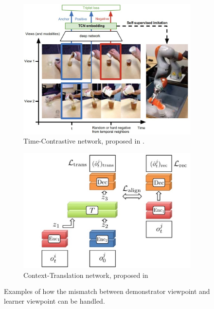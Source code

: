 \begin{figure}[b!]
    \centering
    \begin{subfigure}[b]{0.50\textwidth}
        \centering
        \includegraphics[width=\textwidth]{Figures/images/view_point_mismatch/time-contrastive-network.jpg}
        \caption{Time-Contrastive network, proposed in \cite{sermanet2018time_contrastive}.}
        \label{fig:time_contrastive}
    \end{subfigure}
    \hfill
    \begin{subfigure}[b]{0.45\textwidth}
        \includegraphics[width=\textwidth]{Figures/images/view_point_mismatch/context-translation-model.jpg}
        \caption{Context-Translation network, proposed in \cite{liu2018imitation_from_observation}}
        \label{fig:context-translation}
    \end{subfigure}
    \caption{Examples of how the mismatch between demonstrator viewpoint and learner viewpoint can be handled.}
    \label{fig:differet_viewpoint}
\end{figure}
